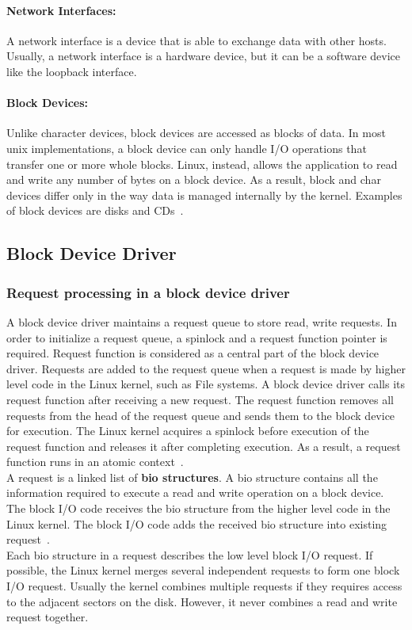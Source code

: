 \paragraph{Network Interfaces:} A network interface is a device that is able to exchange data with other hosts. Usually, a network interface is a hardware device, but it can be a software device like the loopback interface. 

\paragraph{Block Devices:} Unlike character devices, block devices are accessed as blocks of data. In most unix implementations, a block device can only handle I/O operations that transfer one or more whole blocks. Linux, instead, allows the application to read and write any number of bytes on a block device. As a result, block and char devices differ only in the way data is managed internally by the kernel. Examples of block devices are disks and CDs~\cite{Corbet:2005:LDD:1209083}.

\subsection*{Block Device Driver}
\subsubsection*{Request processing in a block device driver}
\label{subsec:request queue}
A block device driver maintains a request queue to store read, write requests. In order to initialize a request queue, a spinlock and a request function pointer is required. Request function is considered as a central part of the block device driver. Requests are added to the request queue when a request is made by higher level code in the Linux kernel, such as File systems. A block device driver calls its request function after receiving a new request. The request function removes all requests from the head of the request queue and sends them to the block device for execution. The Linux kernel acquires a spinlock before execution of the request function and releases it after completing execution. As a result, a request function runs in an atomic context~\cite{Corbet:2005:LDD:1209083}.
\\[3mm]
A request is a linked list of \textbf{bio structures}. A bio structure contains all the information required to execute a read and write operation on a block device. The block I/O code receives the bio structure from the higher level code in the Linux kernel. The block I/O code adds the received bio structure into existing request~\cite{Corbet:2005:LDD:1209083}.
\\[3mm]
Each bio structure in a request describes the low level block I/O request. If possible, the Linux kernel merges several independent requests to form one block I/O request. Usually the kernel combines multiple requests if they requires access to the adjacent sectors on the disk. However, it never combines a read and write request together.

